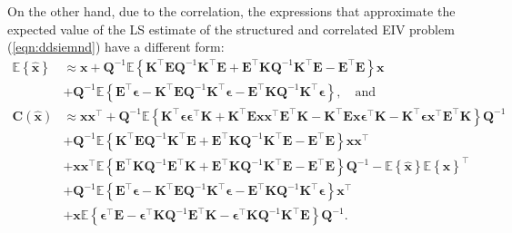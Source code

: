 On the other hand, due to the correlation, the expressions that approximate the expected value of the LS estimate of the structured and correlated EIV problem (\ref{eqn:ddsiemnd}) have a different form:
\begin{equation} \begin{aligned} \mathbb{E} \left\{ \widehat{\mathbf{x}} \right\} & \approx \mathbf{x}  +  \mathbf{Q}^{-1} \mathbb{E} \left\{ \mathbf{K}^\top \mathbf{E} \mathbf{Q}^{-1} \mathbf{K}^\top \mathbf{E} + \mathbf{E}^\top \mathbf{K} \mathbf{Q}^{-1} \mathbf{K}^\top \mathbf{E} - \mathbf{E}^\top \mathbf{E}  \right\} \mathbf{x} \\ 
& + \mathbf{Q}^{-1} \mathbb{E} \left\{ \mathbf{E}^\top \bm{\epsilon} - \mathbf{K}^\top \mathbf{E} \mathbf{Q}^{-1} \mathbf{K}^\top \bm{\epsilon} - \mathbf{E}^\top \mathbf{K} \mathbf{Q}^{-1} \mathbf{K}^\top \bm{\epsilon} \right\} , \quad \text{and}  \\ 
\mathbf{C} \left( \widehat{\mathbf{x}} \right)  & \approx \mathbf{x} \mathbf{x}^\top + \mathbf{Q}^{-1} \mathbb{E} \left\{ \mathbf{K}^\top \bm{\epsilon} \bm{\epsilon}^\top \mathbf{K} + \mathbf{K}^\top \mathbf{E} \mathbf{x} \mathbf{x}^\top \mathbf{E}^\top \mathbf{K} - \mathbf{K}^\top \mathbf{E} \mathbf{x} \bm{\epsilon}^\top \mathbf{K} - \mathbf{K}^\top \bm{\epsilon} \mathbf{x}^\top \mathbf{E}^\top \mathbf{K} \right\} \mathbf{Q}^{-1}  \\
& + \mathbf{Q}^{-1} \mathbb{E} \left\{ \mathbf{K}^\top \mathbf{E} \mathbf{Q}^{-1} \mathbf{K}^\top \mathbf{E} + \mathbf{E}^\top \mathbf{K} \mathbf{Q}^{-1} \mathbf{K}^\top \mathbf{E} - \mathbf{E}^\top \mathbf{E} \right\} \mathbf{x} \mathbf{x}^\top \\
& + \mathbf{x} \mathbf{x}^\top \mathbb{E} \left\{ \mathbf{E}^\top \mathbf{K} \mathbf{Q}^{-1} \mathbf{E}^\top \mathbf{K} + \mathbf{E}^\top \mathbf{K} \mathbf{Q}^{-1} \mathbf{K}^\top \mathbf{E} - \mathbf{E}^\top \mathbf{E} \right\} \mathbf{Q}^{-1} - \mathbb{E} \left\{ \widehat{\mathbf{x}} \right\} \mathbb{E} \left\{ \widehat{\mathbf{x}} \right\}^\top \\ 
& + \mathbf{Q}^{-1} \mathbb{E} \left\{ \mathbf{E}^\top \bm{\epsilon} - \mathbf{K}^\top \mathbf{E} \mathbf{Q}^{-1} \mathbf{K}^\top \bm{\epsilon} - \mathbf{E}^\top \mathbf{K} \mathbf{Q}^{-1} \mathbf{K}^\top \bm{\epsilon} \right\} \mathbf{x}^\top \\
& + \mathbf{x} \mathbb{E} \left\{ \bm{\epsilon}^\top \mathbf{E} - \bm{\epsilon}^\top \mathbf{K} \mathbf{Q}^{-1} \mathbf{E}^\top \mathbf{K} - \bm{\epsilon}^\top \mathbf{K} \mathbf{Q}^{-1} \mathbf{K}^\top \mathbf{E} \right\} \mathbf{Q}^{-1}. \label{eqn:EC_E} \end{aligned} \end{equation} 
